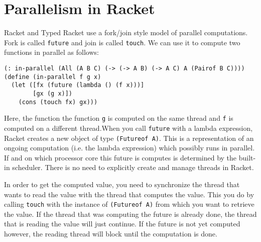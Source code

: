\documentclass{article}
\begin{document}
\begin{center}
\end{center}

\section{Parallelism in Racket}

Racket and Typed Racket use a fork/join style model of parallel computations. Fork is called \lstinline{future} and join is called \lstinline{touch}. We can use it to compute two functions in parallel as follows:

\begin{lstlisting}
(: in-parallel (All (A B C) (-> (-> A B) (-> A C) A (Pairof B C))))
(define (in-parallel f g x)
  (let ([fx (future (lambda () (f x)))]
        [gx (g x)])
    (cons (touch fx) gx)))
\end{lstlisting}

Here, the function the function \lstinline{g} is computed on the same thread and \lstinline{f} is computed on a different thread.When you call \lstinline{future} with a lambda expression, Racket creates a new object of type \lstinline{(Futureof A)}. This is a representation of an ongoing computation (i.e. the lambda expression) which possibly runs in parallel. If and on which processor core this future is computes is determined by the built-in scheduler. There is no need to explicitly create and manage threads in Racket.

In order to get the computed value, you need to synchronize the thread that wants to read the value with the thread that computes the value. This you do by calling \lstinline{touch} with the instance of \lstinline{(Futureof A)} from which you want to retrieve the value. If the thread that was computing the future is already done, the thread that is reading the value will just continue. If the future is not yet computed however, the reading thread will block until the computation is done.
\end{document}
